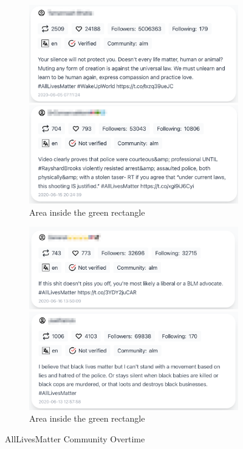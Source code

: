 \begin{figure}[H]
\begin{subfigure}{.45\textwidth}
  \centering
  \captionsetup{justification=centering}
  \includegraphics[width=0.9\linewidth]{./pics/obser4.png}  
  
  \includegraphics[width=0.9\linewidth]{./pics/obser5.png} 
 \caption{Area inside the green rectangle}
  \label{fig:sub-third-aigr}
\end{subfigure}
\begin{subfigure}{.45\textwidth}
  \centering
  \captionsetup{justification=centering}
  \includegraphics[width=0.9\linewidth]{./pics/obser6.png}
  
  \includegraphics[width=0.9\linewidth]{./pics/obser7.png}
 \caption{Area inside the green rectangle}
  \label{fig:sub-fourth-aigrr}
\end{subfigure}

\captionsetup{justification=centering}
\caption{AllLivesMatter Community Overtime}
\label{fig:e-alm-overtime}
\end{figure}


